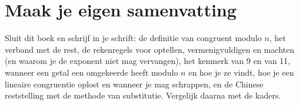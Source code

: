 \begin{oefeningen}






\end{oefeningen}


\ifzelfstudie
\section*{Maak je eigen samenvatting}
Sluit dit boek en schrijf in je schrift: de definitie van congruent modulo $n$, het verband met de rest, de rekenregels voor optellen, vermenigvuldigen en machten (en waarom je de exponent niet mag vervangen), het kenmerk van 9 en van 11, wanneer een getal een omgekeerde heeft modulo $n$ en hoe je ze vindt, hoe je een lineaire congruentie oplost en wanneer je mag schrappen, en de Chinese reststelling met de methode van substitutie. Vergelijk daarna met de kaders.
\fi
